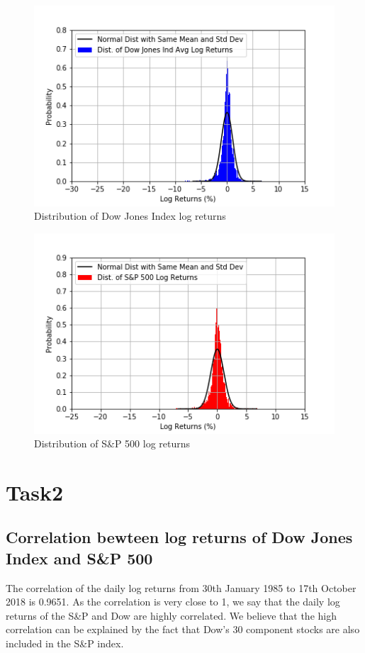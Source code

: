 \documentclass[a4paper]{article}
\begin{document}
\newpage
\begin{figure}[h!]
	\includegraphics[width=\linewidth]{DJInorm.png}
	\caption{Distribution of Dow Jones Index log returns}
\end{figure}
\begin{figure}[h!]
	\includegraphics[width=\linewidth]{GSPCnorm.png}
	\caption{Distribution of S\&P 500 log returns}
\end{figure}


\newpage
\section{Task2}
\label{sec:introduction}

\subsection{Correlation bewteen log returns of Dow Jones Index and S\&P 500}
The correlation of the daily log returns from 30th January 1985 to 17th October 2018 is 0.9651. As the correlation is very close to 1, we say that the daily log returns of the S\&P and Dow are highly correlated. We believe that the high correlation can be explained by the fact that Dow’s 30 component stocks are also included in the S\&P index. 
\end{document}
